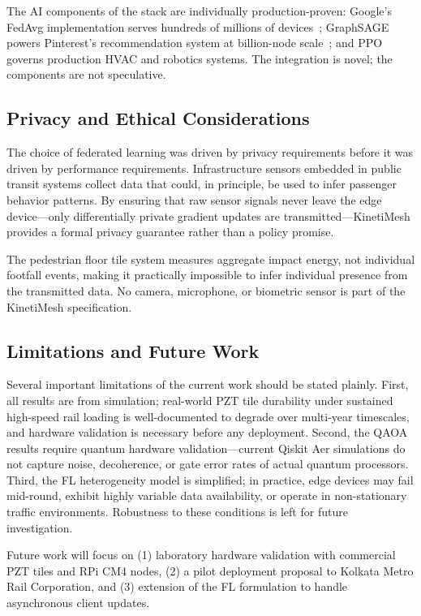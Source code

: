 \documentclass[conference]{IEEEtran}
\begin{document}
The AI components of the stack are individually production-proven: Google's FedAvg implementation serves hundreds of millions of devices~\cite{mcmahan2017}; GraphSAGE powers Pinterest's recommendation system at billion-node scale~\cite{graphsage2017}; and PPO governs production HVAC and robotics systems. The integration is novel; the components are not speculative.

\subsection{Privacy and Ethical Considerations}

The choice of federated learning was driven by privacy requirements before it was driven by performance requirements. Infrastructure sensors embedded in public transit systems collect data that could, in principle, be used to infer passenger behavior patterns. By ensuring that raw sensor signals never leave the edge device—only differentially private gradient updates are transmitted—KinetiMesh provides a formal privacy guarantee rather than a policy promise.

The pedestrian floor tile system measures aggregate impact energy, not individual footfall events, making it practically impossible to infer individual presence from the transmitted data. No camera, microphone, or biometric sensor is part of the KinetiMesh specification.

\subsection{Limitations and Future Work}

Several important limitations of the current work should be stated plainly. First, all results are from simulation; real-world PZT tile durability under sustained high-speed rail loading is well-documented to degrade over multi-year timescales, and hardware validation is necessary before any deployment. Second, the QAOA results require quantum hardware validation—current Qiskit Aer simulations do not capture noise, decoherence, or gate error rates of actual quantum processors. Third, the FL heterogeneity model is simplified; in practice, edge devices may fail mid-round, exhibit highly variable data availability, or operate in non-stationary traffic environments. Robustness to these conditions is left for future investigation.

Future work will focus on (1) laboratory hardware validation with commercial PZT tiles and RPi CM4 nodes, (2) a pilot deployment proposal to Kolkata Metro Rail Corporation, and (3) extension of the FL formulation to handle asynchronous client updates.
\end{document}
